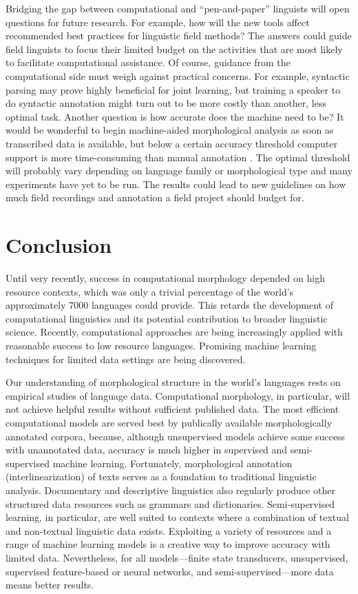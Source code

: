 \documentclass[12pt]{article}
\begin{document}
Bridging the gap between computational and ``pen-and-paper'' linguists will open questions for future research. For example, how will the new tools affect recommended best practices for linguistic field methods? The answers could guide field linguists to focus their limited budget on the activities that are most likely to facilitate computational assistance. Of course, guidance from the computational side must weigh against practical concerns. For example, syntactic parsing may prove highly beneficial for joint learning, but training a speaker to do syntactic annotation might turn out to be more costly than another, less optimal task. Another question is how accurate does the machine need to be? It would be wonderful to begin machine-aided morphological analysis as soon as transcribed data is available, but below a certain accuracy threshold computer support is more time-consuming than manual annotation \cite{kothur_document-level_2018,palmer_semi-automated_2009}. The optimal threshold will probably vary depending on language family or morphological type and many experiments have yet to be run. The results could lead to new guidelines on how much field recordings and annotation a field project should budget for.

\section{Conclusion}

Until very recently, success in computational morphology depended on high resource contexts, which was only a trivial percentage of the world’s approximately 7000 languages could provide. This retards the development of computational linguistics and its potential contribution to broader linguistic science. Recently, computational approaches are being increasingly applied with reasonable success to low resource languages. Promising machine learning techniques for limited data settings are being discovered. 

Our understanding of morphological structure in the world's languages rests on empirical studies of language data. Computational morphology, in particular, will not achieve helpful results without sufficient published data. The most efficient computational models are served best by publically available morphologically annotated corpora, because, although unsupervised models achieve some success with unannotated data, accuracy is much higher in supervised and semi-supervised machine learning. Fortunately, morphological annotation (interlinearization) of texts serves as a foundation to traditional linguistic analysis. Documentary and descriptive linguistics also regularly produce other structured data resources such as grammars and dictionaries. Semi-supervised learning, in particular, are well suited to contexts where a combination of textual and non-textual linguistic data exists. Exploiting a variety of resources and a range of machine learning models is a creative way to improve accuracy with limited data. Nevertheless, for all models—finite state transducers, unsupervised, supervised feature-based or neural networks, and semi-supervised—more data means better results. 
\end{document}
